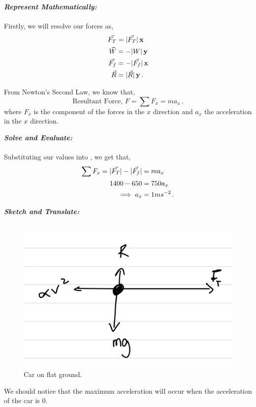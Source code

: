 \begin{subquestions}
\begin{subsubquestions}
\textbf{\textit{Represent Mathematically:}} \\ \\
Firstly, we will resolve our forces as,
\begin{align}
	\vec{F_T} & = |\vec{F_T}|\,\mathbf{x} \\
	\vec{W} & = -|W|\,\mathbf{y} \\
	\vec{F_f} & = -|\vec{F_f}|\,\mathbf{x} \\
	\vec{R} & = |\vec{R}|\,\mathbf{y} \,.
\end{align}

From Newton's Second Law, we know that,
\begin{equation}
	\text{Resultant Force, }F = \sum F_x = ma_x \label{2009:q5:FxEqn2} \,.
\end{equation}
where $F_x$ is the component of the forces in the $x$ direction and $a_x$ the acceleration in the $x$ direction.




\textbf{\textit{Solve and Evaluate:}} \\ \\
Substituting our values into , we get that,
\begin{align}
	\sum F_x = |\vec{F_T}|-|\vec{F_f}| & = ma_x \nonumber \\
	           1400 - 650 & = 750a_x \nonumber \\
	           \implies a_x & = 1 ms^{-2} \,.
\end{align}


\subsubquestion
\textbf{\textit{Sketch and Translate:}} \\ \\
\begin{figure}[H]
	\begin{center}
		\includegraphics[scale=0.25]{../2009/figures/2009q5-2}
		\caption{\label{2009:q5:Sketch3} Car on flat ground.}
	\end{center}
\end{figure}	
We should notice that the maximum acceleration will occur when the acceleration of the car is 0.





\end{subsubquestions}
\end{subquestions}
